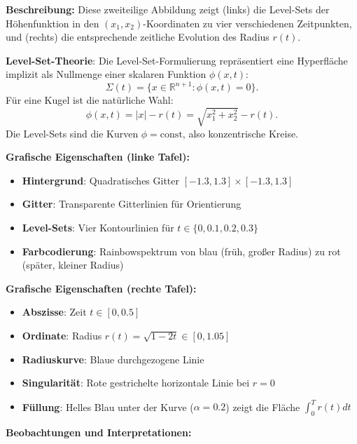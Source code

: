 \documentclass[a4paper,12pt]{article}
\theoremstyle{definition}
\begin{document}
\textbf{Beschreibung:} Diese zweiteilige Abbildung zeigt (links) die Level-Sets der Höhenfunktion in den $(x_1, x_2)$-Koordinaten zu vier verschiedenen Zeitpunkten, und (rechts) die entsprechende zeitliche Evolution des Radius $r(t)$.

\textbf{Level-Set-Theorie}: Die Level-Set-Formulierung repräsentiert eine Hyperfläche implizit als Nullmenge einer skalaren Funktion $\phi(x,t)$:
\[
\Sigma(t) = \{x \in \mathbb{R}^{n+1} : \phi(x,t) = 0\}.
\]
Für eine Kugel ist die natürliche Wahl:
\[
\phi(x,t) = |x| - r(t) = \sqrt{x_1^2 + x_2^2} - r(t).
\]
Die Level-Sets sind die Kurven $\phi = \text{const}$, also konzentrische Kreise.

\textbf{Grafische Eigenschaften (linke Tafel):}
\begin{itemize}
	\item \textbf{Hintergrund}: Quadratisches Gitter $[-1.3, 1.3] \times [-1.3, 1.3]$
	\item \textbf{Gitter}: Transparente Gitterlinien für Orientierung
	\item \textbf{Level-Sets}: Vier Kontourlinien für $t \in \{0, 0.1, 0.2, 0.3\}$
	\item \textbf{Farbcodierung}: Rainbowspektrum von blau (früh, großer Radius) zu rot (später, kleiner Radius)
\end{itemize}

\textbf{Grafische Eigenschaften (rechte Tafel):}
\begin{itemize}
	\item \textbf{Abszisse}: Zeit $t \in [0, 0.5]$
	\item \textbf{Ordinate}: Radius $r(t) = \sqrt{1 - 2t} \in [0, 1.05]$
	\item \textbf{Radiuskurve}: Blaue durchgezogene Linie
	\item \textbf{Singularität}: Rote gestrichelte horizontale Linie bei $r = 0$
	\item \textbf{Füllung}: Helles Blau unter der Kurve ($\alpha = 0.2$) zeigt die Fläche $\int_0^T r(t) dt$
\end{itemize}

\textbf{Beobachtungen und Interpretationen:}
\end{document}
